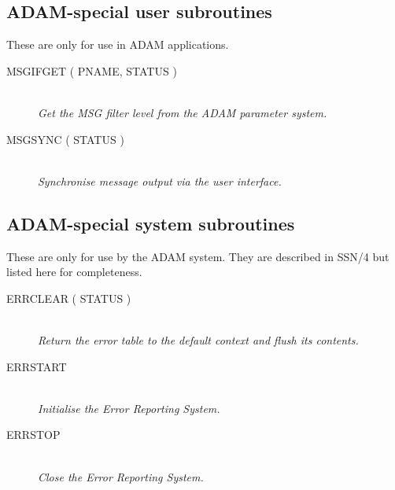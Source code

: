 \documentclass[twoside,11pt]{article}
\newcommand{\htmlref}[2]{#1}
\newcommand{\xref}[3]{#1}
\newcommand{\xlabel}[1]{}
\renewcommand{\_}{\texttt{\symbol{95}}}
\newcommand{\listline}{\hspace{1pt}\\}
\newcommand{\listline}{}
\begin{document}
\subsection{\xlabel{adam_special_user_subroutines}ADAM-special user subroutines}
These are only for use in ADAM applications.
\begin {description}
\item [\htmlref{MSG\_IFGET}{MSG_IFGET} ( PNAME, STATUS )] \listline
\textit{ Get the MSG filter level from the ADAM parameter system.}
\item [\htmlref{MSG\_SYNC}{MSG_SYNC} ( STATUS )] \listline
\textit{ Synchronise message output via the user interface.}
\end{description}

\subsection{\xlabel{adam_special_system_subroutines}ADAM-special system subroutines}
These are only for use by the ADAM system. They are described in
\xref{SSN/4}{ssn4}{routines_specific_to_the_adam_fixed_part}
but listed here for completeness.
\begin {description}
\item [\xref{ERR\_CLEAR}{ssn4}{ERR_CLEAR} ( STATUS )] \listline
\textit{ Return the error table to the default context and flush its contents.}
\item [\xref{ERR\_START}{ssn4}{ERR_START}] \listline
\textit{ Initialise the Error Reporting System.}
\item [\xref{ERR\_STOP}{ssn4}{ERR_STOP}] \listline
\textit{ Close the Error Reporting System.}
\end{description}

\newpage
\end{document}
